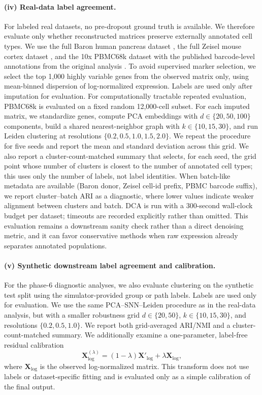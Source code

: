 \documentclass{article}
\theoremstyle{plain}
\theoremstyle{definition}
\theoremstyle{remark}
\begin{document}
\paragraph{(iv) Real-data label agreement.}
For labeled real datasets, no pre-dropout ground truth is available. We therefore
evaluate only whether reconstructed matrices preserve externally annotated cell
types. We use the full Baron human pancreas dataset \citep{Baron2016Pancreas},
the full Zeisel mouse cortex dataset \citep{Zeisel2015Cortex}, and the 10x
PBMC68k dataset with the published barcode-level annotations from the original
analysis \citep{Zheng2017TenX}. To avoid supervised marker selection, we select
the top 1,000 highly variable genes from the observed matrix only, using
mean-binned dispersion of log-normalized expression. Labels are used only after
imputation for evaluation.
For computationally tractable repeated evaluation, PBMC68k is evaluated on a
fixed random 12,000-cell subset. For each imputed matrix, we standardize genes,
compute PCA embeddings with $d\in\{20,50,100\}$ components, build a shared
nearest-neighbor graph with $k\in\{10,15,30\}$, and run Leiden clustering
\citep{Traag2019Leiden} at resolutions
$\{0.2,0.5,1.0,1.5,2.0\}$. We repeat the procedure for five seeds and report
the mean and standard deviation across this grid. We also report a
cluster-count-matched summary that selects, for each seed, the grid point whose
number of clusters is closest to the number of annotated cell types; this uses
only the number of labels, not label identities. When batch-like metadata are
available (Baron donor, Zeisel cell-id prefix, PBMC barcode suffix), we report
cluster--batch ARI as a diagnostic, where lower values indicate weaker
alignment between clusters and batch. DCA is run with a 300-second wall-clock
budget per dataset; timeouts are recorded explicitly rather than omitted.
This evaluation remains a downstream sanity check rather than a direct
denoising metric, and it can favor conservative methods when raw expression
already separates annotated populations.

\paragraph{(v) Synthetic downstream label agreement and calibration.}
For the phase-6 diagnostic analyses, we also evaluate clustering on the
synthetic test split using the simulator-provided group or path labels. Labels
are used only for evaluation. We use the same PCA--SNN--Leiden procedure as in
the real-data analysis, but with a smaller robustness grid
$d\in\{20,50\}$, $k\in\{10,15,30\}$, and resolutions
$\{0.2,0.5,1.0\}$. We report both grid-averaged ARI/NMI and a
cluster-count-matched summary. We additionally examine a one-parameter,
label-free residual calibration
\[
\mathbf{X}^{(\lambda)}_{\log}=(1-\lambda)\mathbf{X}'_{\log}
+\lambda\mathbf{X}_{\log},
\]
where $\mathbf{X}_{\log}$ is the observed log-normalized matrix. This transform
does not use labels or dataset-specific fitting and is evaluated only as a
simple calibration of the final output.
\end{document}
